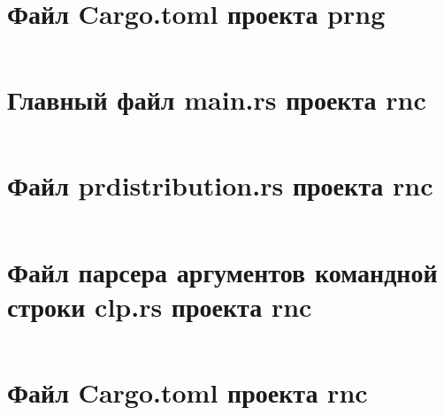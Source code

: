 \documentclass[spec, och, pract_otchet]{SCWorks}
\begin{document}
\section{Файл Cargo.toml проекта prng}
\inputminted{rust}{../prng/Cargo.toml}


\section{Главный файл main.rs проекта rnc}
\inputminted{rust}{../rnc/src/main.rs}

\section{Файл prdistribution.rs проекта rnc}
\inputminted{rust}{../rnc/src/prdistribution.rs}

\section{Файл парсера аргументов командной строки clp.rs проекта rnc}
\inputminted{rust}{../rnc/src/clp.rs}

\section{Файл Cargo.toml проекта rnc}
\inputminted{rust}{../rnc/Cargo.toml}
\end{document}
